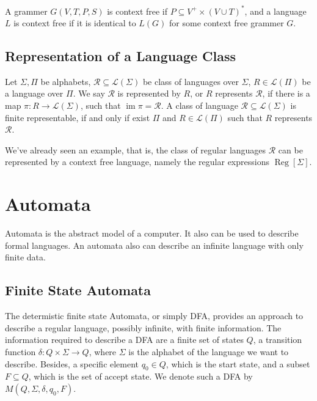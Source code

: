 \documentclass{article}
\def\im{\mathop{\mathrm{im}}}
\def\Reg{\mathop{\mathrm{Reg}}}
\begin{document}
A grammer $G(V, T, P, S)$ is context free if $P \subseteq V^+ \times (V \cup T)^\ast$,
and a language $L$ is context free if it is identical to $L(G)$ for some context free grammer $G$.

\subsection{Representation of a Language Class}
Let $\Sigma, \Pi$ be alphabets,
$\mathcal{R} \subseteq \mathcal{L}(\Sigma)$ be class of languages over $\Sigma$,
$R \in \mathcal{L}(\Pi)$ be a language over $\Pi$.
We say $\mathcal{R}$ is represented by $R$, or $R$ represents $\mathcal{R}$,
if there is a map $\pi : R \to \mathcal{L}(\Sigma)$, such that $\im \pi = \mathcal{R}$.
A class of language $\mathcal{R} \subseteq \mathcal{L}(\Sigma)$ is finite representable,
if and only if exist $\Pi$ and $R \in \mathcal{L}(\Pi)$ such that $R$ represents $\mathcal{R}$.

We've already seen an example, that is,
the class of regular languages $\mathcal{R}$ can be represented by a context free language,
namely the regular expressions $\Reg[\Sigma]$.


\section{Automata}
Automata is the abstract model of a computer. It also can be used to describe formal languages.
An automata also can describe an infinite language with only finite data.

\subsection{Finite State Automata}
The determistic finite state Automata, or simply DFA,
provides an approach to describe a regular language, possibly infinite, with finite information.
The information required to describe a DFA are a finite set of states $Q$,
a transition function $\delta : Q \times \Sigma \to Q$,
where $\Sigma$ is the alphabet of the language we want to describe.
Besides, a specific element $q_0 \in Q$, which is the start state,
and a subset $F \subseteq Q$, which is the set of accept state.
We denote such a DFA by $M(Q, \Sigma, \delta, q_0, F)$.
\end{document}
